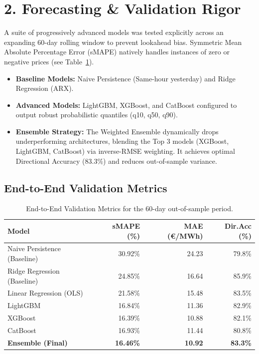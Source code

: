 \documentclass[11pt,a4paper]{article}
\begin{document}
\section{2. Forecasting \& Validation Rigor}
A suite of progressively advanced models was tested explicitly across an expanding 60-day rolling window to prevent lookahead bias. Symmetric Mean Absolute Percentage Error (sMAPE) natively handles instances of zero or negative prices (see Table~\ref{tab:metrics}).

\begin{itemize}
    \setlength\itemsep{0em}
    \item \textbf{Baseline Models:} Naive Persistence (Same-hour yesterday) and Ridge Regression (ARX).
    \item \textbf{Advanced Models:} LightGBM, XGBoost, and CatBoost configured to output robust probabilistic quantiles (q10, q50, q90).
    \item \textbf{Ensemble Strategy:} The Weighted Ensemble dynamically drops underperforming architectures, blending the Top 3 models (XGBoost, LightGBM, CatBoost) via inverse-RMSE weighting. It achieves optimal Directional Accuracy (83.3\%) and reduces out-of-sample variance.
\end{itemize}

\subsection{End-to-End Validation Metrics}
\vspace{-0.5em}
\begin{table}[H]
    \centering
    \small
    \begin{tabular}{lrrr}
        \toprule
        \textbf{Model} & \textbf{sMAPE (\%)} & \textbf{MAE (€/MWh)} & \textbf{Dir.Acc (\%)} \\
        \midrule
        Naive Persistence (Baseline) & 30.92\% & 24.23 & 79.8\% \\
        Ridge Regression (Baseline) & 24.85\% & 16.64 & 85.9\% \\
        Linear Regression (OLS) & 21.58\% & 15.48 & 83.5\% \\
        LightGBM & 16.84\% & 11.36 & 82.9\% \\
        XGBoost & 16.39\% & 10.88 & 82.1\% \\
        CatBoost & 16.93\% & 11.44 & 80.8\% \\
        \textbf{Ensemble (Final)} & \textbf{16.46\%} & \textbf{10.92} & \textbf{83.3\%} \\
        \bottomrule
    \end{tabular}
    \caption{End-to-End Validation Metrics for the 60-day out-of-sample period.}
    \label{tab:metrics}
\end{table}
\end{document}
